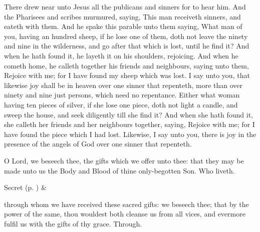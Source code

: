 
\clearpage
{}
 There drew near unto Jesus all the publicans and sinners for to hear him. And the Pharisees and scribes murmured, saying, This man receiveth sinners, and eateth with them. And he spake this parable unto them saying, What man of you, having an hundred sheep, if he lose one of them, doth not leave the ninety and nine in the wilderness, and go after that which is lost, until he find it? And when he hath found it, he layeth it on his shoulders, rejoicing. And when he cometh home, he calleth together his friends and neighbours, saying unto them, Rejoice with me; for I have found my sheep which was lost. I say unto you, that likewise joy shall be in heaven over one sinner that repenteth, more than over ninety and nine just persons, which need no repentance. Either what woman having ten pieces of silver, if she lose one piece, doth not light a candle, and sweep the house, and seek diligently till she find it? And when she hath found it, she calleth her friends and her neighbours together, saying, Rejoice with me; for I have found the piece which I had lost. Likewise, I say unto you, there is joy in the presence of the angels of God over one sinner that repenteth.


\secret\label{TrinityIIISecret}
 O Lord, we beseech thee, the gifts which we offer unto thee: that they may be made unto us the Body and Blood of thine only-begotten Son. Who liveth.

\begin{rubric}
     Secret  (p. \pageref{SPSaints}) \&  
\end{rubric}


\postcommunion\label{TrinityIIIPostcommunion}
 through whom we have received these sacred gifts: we beseech thee; that by the power of the same, thou wouldest both cleanse us from all vices, and evermore fulfil us with the gifts of thy grace. Through.

